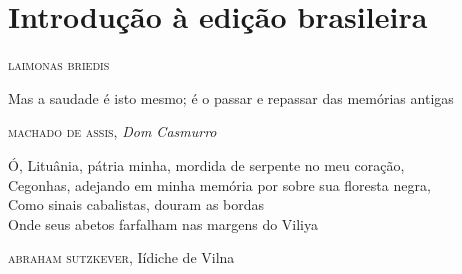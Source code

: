 \chapter[Introdução à edição brasileira]{Introdução à edição brasileira }

\begin{flushright}
\textsc{laimonas briedis}
\end{flushright}

\epigraph{Mas a saudade é isto mesmo; é o passar e repassar das memórias
antigas}{\textsc{machado de assis}, \textit{Dom Casmurro}}

\epigraph{Ó, Lituânia, pátria minha, mordida de serpente no meu coração,\\Cegonhas, adejando em minha memória por sobre sua floresta negra,\\Como sinais cabalistas, douram as bordas\\Onde seus abetos farfalham nas margens do Viliya}{\textsc{abraham sutzkever}, Iídiche de Vilna}


